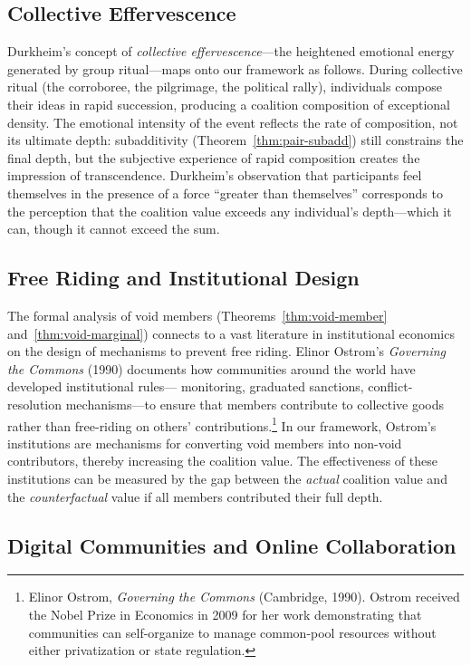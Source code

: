 \subsection{Collective Effervescence}

Durkheim's concept of \emph{collective effervescence}---the heightened
emotional energy generated by group ritual---maps onto our framework
as follows.  During collective ritual (the corroboree, the pilgrimage,
the political rally), individuals compose their ideas in rapid succession,
producing a coalition composition of exceptional density.  The emotional
intensity of the event reflects the rate of composition, not its ultimate
depth: subadditivity (Theorem~\ref{thm:pair-subadd}) still constrains
the final depth, but the subjective experience of rapid composition
creates the impression of transcendence.  Durkheim's observation that
participants feel themselves in the presence of a force ``greater than
themselves'' corresponds to the perception that the coalition value
exceeds any individual's depth---which it can, though it cannot exceed
the sum.

\subsection{Free Riding and Institutional Design}

The formal analysis of void members (Theorems~\ref{thm:void-member}
and~\ref{thm:void-marginal}) connects to a vast literature in
institutional economics on the design of mechanisms to prevent free
riding.  Elinor Ostrom's \textit{Governing the Commons} (1990) documents
how communities around the world have developed institutional rules---
monitoring, graduated sanctions, conflict-resolution mechanisms---to
ensure that members contribute to collective goods rather than free-riding
on others' contributions.\footnote{Elinor Ostrom, \textit{Governing the
Commons} (Cambridge, 1990).  Ostrom received the Nobel Prize in Economics
in 2009 for her work demonstrating that communities can self-organize to
manage common-pool resources without either privatization or state
regulation.}  In our framework, Ostrom's institutions are mechanisms for
converting void members into non-void contributors, thereby increasing
the coalition value.  The effectiveness of these institutions can be
measured by the gap between the \emph{actual} coalition value and the
\emph{counterfactual} value if all members contributed their full depth.

\subsection{Digital Communities and Online Collaboration}

